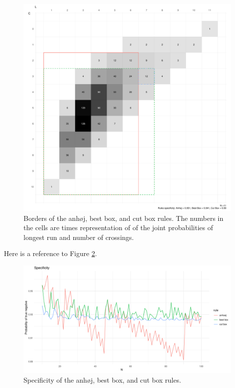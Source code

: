 \begin{figure}[htbp]
  \centering
  \includegraphics[width=\textwidth]{fig_box11.pdf}
  \caption{Borders of the anhøj, best box, and cut box rules.  
           The numbers in the cells are times representation of of the joint
           probabilities of longest run and number of crossings.}
  \label{figure:box11}
\end{figure}

Here is a reference to Figure \ref{figure:spec}.

\begin{figure}[htbp]
  \centering
  \includegraphics[width=\textwidth]{fig_spec.pdf}
  \caption{Specificity of the anhøj, best box, and cut box rules.}
  \label{figure:spec}
\end{figure}

